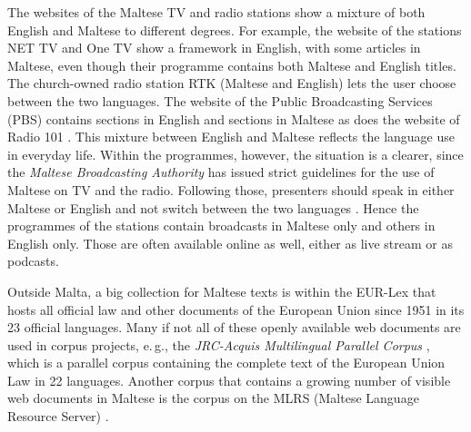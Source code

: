 \begin{multicols}{2}
The websites of the Maltese TV and radio stations show a mixture of both English and Maltese to different degrees. For example, the website of the stations NET TV \cite{NetTV1} and One TV \cite{OneTV1} show a framework in English, with some articles in Maltese, even though their programme contains both Maltese and English titles. The church-owned radio station RTK \cite{RTK1} (Maltese and English) lets the user choose between the two languages. The website of the Public Broadcasting Services (PBS) \cite{PBS1} contains sections in English and sections in Maltese as does the website of Radio 101 \cite{radio101}. This mixture between English and Maltese reflects the language use in everyday life. Within the programmes, however, the situation is a clearer, since the \emph{Maltese Broadcasting Authority} has issued strict guidelines for the use of Maltese on TV and the radio. Following those, presenters should speak in either Maltese or English and not switch between the two languages \cite{Fabri:2011a}. Hence the programmes of the stations contain broadcasts in Maltese only and others in English only. Those are often available online as well, either as live stream or as podcasts.

Outside Malta, a big collection for Maltese texts is within the EUR-Lex \cite{EURLex1} that hosts all official law and other documents of the European Union since 1951 in its 23 official languages.
Many if not all of these openly available web documents are used in corpus projects, e.\,g., the \emph{JRC-Acquis Multilingual Parallel Corpus} \cite{JRC-Acquis1}, which is a parallel corpus containing the complete text of the European Union Law in 22 languages. Another corpus that contains a growing number of visible web documents in Maltese is the corpus on the MLRS (Maltese Language Resource Server) \cite{MLRS1}.
\end{multicols}

\clearpage


